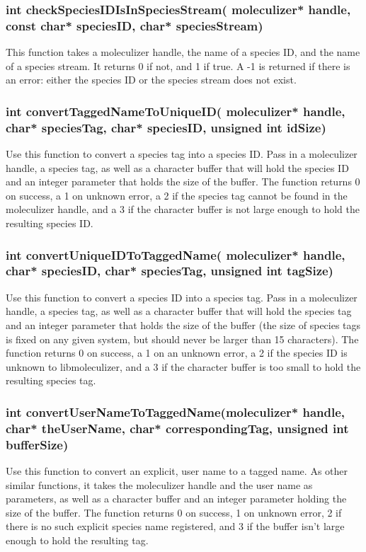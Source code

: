 \subsubsection{int checkSpeciesIDIsInSpeciesStream( moleculizer*
  handle, const  char* speciesID, char* speciesStream)}
This function takes a moleculizer handle, the name of a species ID,
and the name of a species stream.  It returns 0 if not, and 1 if true.
A -1 is returned if there is an error: either the species ID or the
species stream does not exist. 

\subsubsection{int convertTaggedNameToUniqueID( moleculizer* handle,
  char* speciesTag, char* speciesID, unsigned int idSize)}
Use this function to convert a species tag into a species ID.  Pass in
a moleculizer handle, a species tag, as well as a character buffer
that will hold the species ID and an integer parameter that holds the
size of the buffer.  The function returns 0 on success, a 1 on unknown
error, a 2 if the species tag cannot be found in the moleculizer
handle, and a 3 if the character buffer is not large enough to hold
the resulting species ID.  

\subsubsection{int convertUniqueIDToTaggedName( moleculizer* handle,
  char* speciesID, char* speciesTag, unsigned int tagSize)}
Use this function to convert a species ID into a species tag.  Pass in
a moleculizer handle, a species tag, as well as a character buffer
that will hold the species tag and an integer parameter that holds the
size of the buffer (the size of species tags is fixed on any given
system, but should never be larger than 15 characters).  The function
returns 0 on success, a 1 on an unknown error, a 2 if the species ID
is unknown to libmoleculizer, and a 3 if the character buffer is too
small to hold the resulting species tag.


\subsubsection{int convertUserNameToTaggedName(moleculizer* handle,
  char* theUserName, char* correspondingTag, unsigned int bufferSize)}
Use this function to convert an explicit, user name to a tagged name.
As other similar functions, it takes the moleculizer handle and the
user name as parameters, as well as a character buffer and an integer
parameter holding the size of the buffer.  The function returns 0 on
success, 1 on unknown error, 2 if there is no such explicit species
name registered, and 3 if the buffer isn't large enough to hold the
resulting tag. 

